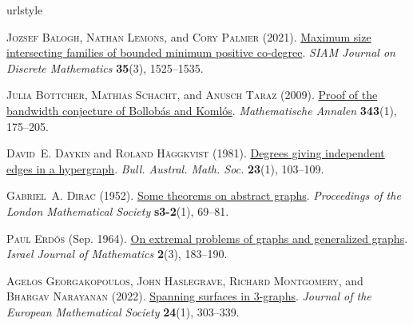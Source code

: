 \documentclass[12pt,reqno]{amsart}
\theoremstyle{plain}
\theoremstyle{definition}
\numberwithin{equation}{section}
\begin{document}
	{
		\fontsize{11pt}{12pt}
		\selectfont
		
		\setlength{\parskip}{2pt plus 0.3ex minus 0.3ex}
		
		\newcommand{\etalchar}[1]{$^{#1}$}
		\begin{thebibliography}{GHMN22}
			\providecommand{\url}[1]{\texttt{#1}}
			\providecommand{\urlprefix}{\textsc{url:} }
			\expandafter\ifx\csname urlstyle\endcsname\relax
			\providecommand{\doi}[1]{doi:\discretionary{}{}{}#1}\else
			\providecommand{\doi}{doi:\discretionary{}{}{}\begingroup \urlstyle{rm}\Url}\fi
			
			\textsc{Jozsef Balogh}, \textsc{Nathan Lemons}, and \textsc{Cory Palmer} (2021).
			\newblock \href{https://doi.org/10.1137/20M1336989}{Maximum size intersecting families of bounded minimum positive co-degree}.
			\newblock \emph{SIAM Journal on Discrete Mathematics} \textbf{35}(3), 1525--1535.
			
			\textsc{Julia B\"{o}ttcher}, \textsc{Mathias Schacht}, and \textsc{Anusch Taraz} (2009).
			\newblock \href{https://doi.org/10.1007/s00208-008-0268-6}{Proof of the bandwidth conjecture of {B}ollob{\'a}s and {K}oml{\'o}s}.
			\newblock \emph{Mathematische Annalen} \textbf{343}(1), 175--205.
			
			\textsc{David~E. Daykin} and \textsc{Roland H\"{a}ggkvist} (1981).
			\newblock \href{https://doi.org/10.1017/S0004972700006924}{Degrees giving independent edges in a hypergraph}.
			\newblock \emph{Bull. Austral. Math. Soc.} \textbf{23}(1), 103--109.
			
			\textsc{Gabriel~A. Dirac} (1952).
			\newblock \href{https://doi.org/https://doi.org/10.1112/plms/s3-2.1.69}{Some theorems on abstract graphs}.
			\newblock \emph{Proceedings of the London Mathematical Society} \textbf{s3-2}(1), 69--81.
			
			\textsc{Paul Erd\H{o}s} (Sep. 1964).
			\newblock \href{https://doi.org/10.1007/BF02759942}{On extremal problems of graphs and generalized graphs}.
			\newblock \emph{Israel Journal of Mathematics} \textbf{2}(3), 183--190.
			
			\textsc{Agelos Georgakopoulos}, \textsc{John Haslegrave}, \textsc{Richard Montgomery}, and \textsc{Bhargav Narayanan} (2022).
			\newblock \href{https://doi.org/10.4171/JEMS/1101}{Spanning surfaces in 3-graphs}.
			\newblock \emph{Journal of the European Mathematical Society} \textbf{24}(1), 303--339.
			

\end{thebibliography}}
\end{document}
